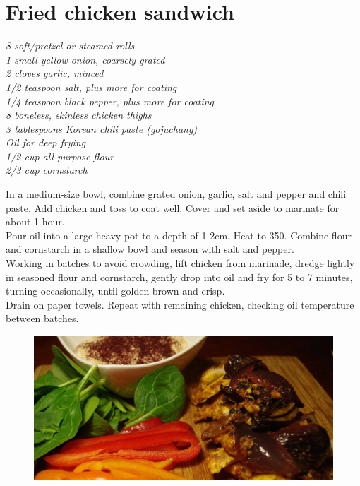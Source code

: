 \documentclass{tufte-book}
\begin{document}
\section{Fried chicken sandwich}

\smallskip
\emph{8 soft/pretzel or steamed rolls
\\1 small yellow onion, coarsely grated
\\2 cloves garlic, minced
\\1/2 teaspoon salt, plus more for coating
\\1/4 teaspoon black pepper, plus more for coating
\\8 boneless, skinless chicken thighs
\\3 tablespoons Korean chili paste (gojuchang)
\\Oil for deep frying
\\1/2 cup all-purpose flour 
\\2/3 cup cornstarch}

\smallskip
In a medium-size bowl, combine grated onion, garlic, salt and pepper and chili paste. Add chicken and toss to coat well. Cover and set aside to marinate for about 1 hour.
\\Pour oil into a large heavy pot to a depth of 1-2cm. Heat to 350\celsius. Combine flour and cornstarch in a shallow bowl and season with salt and pepper.
\\Working in batches to avoid crowding, lift chicken from marinade, dredge lightly in seasoned flour and cornstarch, gently drop into oil and fry for 5 to 7 minutes, turning occasionally, until golden brown and crisp. 
\\Drain on paper towels. Repeat with remaining chicken, checking oil temperature between batches.

\newpage

\begin{figure}[h]
  \includegraphics[width=\linewidth]{chickendoner.JPG}
\end{figure}
\end{document}
